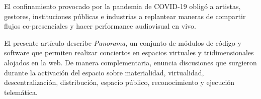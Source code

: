 
El confinamiento provocado por la pandemia de COVID-19 obligó a artistas, gestores, instituciones públicas e industrias a replantear maneras de compartir flujos co-presenciales y hacer performance audiovisual en vivo.

El presente artículo describe \textit{Panorama}, un conjunto de módulos de código y software que permiten realizar conciertos en espacios virtuales y tridimensionales alojados en la web. De manera complementaria, enuncia discusiones que surgieron durante la activación del espacio sobre materialidad, virtualidad, descentralización, distribución, espacio público, reconocimiento y ejecución telemática.                            

